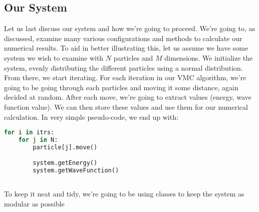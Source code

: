 \documentclass{article}
\begin{document}
\subsection{Our System}
Let us last discuss our system and how we're going to proceed. We're going to, as discussed, examine many various configurations and methods to calculate our numerical results. To aid in better illustrating this, let us assume we have some system we wish to examine with $N$ particles and $M$ dimensions. We initialize the system, evenly distributing the different particles using a normal distribution. From there, we start iterating. For each iteration in our VMC algorithm, we're going to be going through each particles and moving it some distance, again decided at random. After each move, we're going to extract values (energy, wave function value). We can then store these values and use them for our numerical calculation. In very simple pseudo-code, we end up with:
\begin{lstlisting}[language=Python]
for i in itrs:
    for j in N:
        particle[j].move()

        system.getEnergy()
        system.getWaveFunction()
    
\end{lstlisting}
To keep it neat and tidy, we're going to be using classes to keep the system as modular as possible
\end{document}
